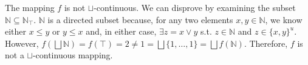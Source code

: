 \documentclass[a4paper,11pt]{article}
\theoremstyle{mytheor}
\begin{document}
The mapping $f$ is not $\sqcup$-continuous. We can disprove
by examining the subset $\mathbb{N} \subseteq \mathbb{N}_{\top}$. 
$\mathbb{N}$ is a directed subset because, for any two elements $x, y 
\in \mathbb{N}$, we know either $x \leq y$ or $y \leq x$ and, in either 
case, $\exists z = x \vee y$ s.t. $z \in \mathbb{N}$ and $z \in \{x, 
y\}^u$. However, $f(\bigsqcup \mathbb{N}) = f(\top) = 2 \neq 1 = 
\bigsqcup \{1,\dots,1\} = \bigsqcup f(\mathbb{N})$.
Therefore, $f$ is not a $\sqcup$-continuous mapping.
\end{document}
